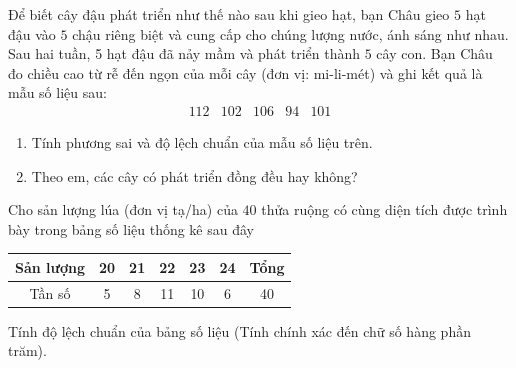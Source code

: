 \begin{bt}%
	Để biết cây đậu phát triển như thế nào sau khi gieo hạt, bạn Châu gieo $5$ hạt đậu vào $5$ chậu riêng biệt và cung cấp cho chúng lượng nước, ánh sáng như nhau. Sau hai tuần, 5 hạt đậu đã nảy mầm và phát triển thành $5$ cây con. Bạn Châu đo chiều cao từ rễ đến ngọn của mỗi cây (đơn vị: mi-li-mét) và ghi kết quả là mẫu số liệu sau:
	$$\begin{array}{lllll}112 & 102 & 106 & 94 & 101\end{array}$$	
	\begin{enumerate}
		\item  Tính phương sai và độ lệch chuẩn của mẫu số liệu trên.
		\item Theo em, các cây có phát triển đồng đều hay không?
	\end{enumerate}
\end{bt}

\begin{bt}%
	Cho sản lượng lúa (đơn vị tạ/ha) của $40$ thửa ruộng có cùng diện tích được trình bày trong bảng số liệu thống kê sau đây
	\begin{center}
		\begin{tabular}{|c|c|c|c|c|c|c|}
			\hline
			Sản lượng&20&21&22&23&24&Tổng\\
			\hline
			Tần số&5&8&11&10&6&40\\
			\hline
		\end{tabular}
	\end{center}
	Tính độ lệch chuẩn của bảng số liệu (Tính chính xác đến chữ số hàng phần trăm).
\end{bt}

